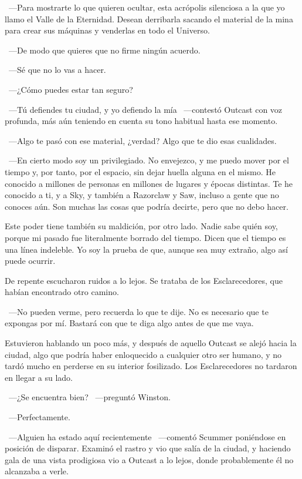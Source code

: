 ~---Para mostrarte lo que quieren ocultar, esta acrópolis silenciosa a la que yo llamo el Valle de la Eternidad. Desean derribarla sacando el material de la mina para crear sus máquinas y venderlas en todo el Universo.

~---De modo que quieres que no firme ningún acuerdo.

~---Sé que no lo vas a hacer.

~---¿Cómo puedes estar tan seguro?

~---Tú defiendes tu ciudad, y yo defiendo la mía ~---contestó Outcast con voz profunda, más aún teniendo en cuenta su tono habitual hasta ese momento.

~---Algo te pasó con ese material, ¿verdad? Algo que te dio esas cualidades.

~---En cierto modo soy un privilegiado. No envejezco, y me puedo mover por el tiempo y, por tanto, por el espacio, sin dejar huella alguna en el mismo. He conocido a millones de personas en millones de lugares y épocas distintas. Te he conocido a ti, y a Sky, y también a Razorclaw y Saw, incluso a gente que no conoces aún. Son muchas las cosas que podría decirte, pero que no debo hacer.

\rquoti Este poder tiene también su maldición, por otro lado. Nadie sabe quién soy, porque mi pasado fue literalmente borrado del tiempo. Dicen que el tiempo es una línea indeleble. Yo soy la prueba de que, aunque sea muy extraño, algo así puede ocurrir.

De repente escucharon ruidos a lo lejos. Se trataba de los Esclarecedores, que habían encontrado otro camino.

~---No pueden verme, pero recuerda lo que te dije. No es necesario que te expongas por mí. Bastará con que te diga algo antes de que me vaya.

Estuvieron hablando un poco más, y después de aquello Outcast se alejó hacia la ciudad, algo que podría haber enloquecido a cualquier otro ser humano, y no tardó mucho en perderse en su interior fosilizado. Los Esclarecedores no tardaron en llegar a su lado.

~---¿Se encuentra bien? ~---preguntó Winston.

~---Perfectamente.

~---Alguien ha estado aquí recientemente ~---comentó Scummer poniéndose en posición de disparar. Examinó el rastro y vio que salía de la ciudad, y haciendo gala de una vista prodigiosa vio a Outcast a lo lejos, donde probablemente él no alcanzaba a verle.

